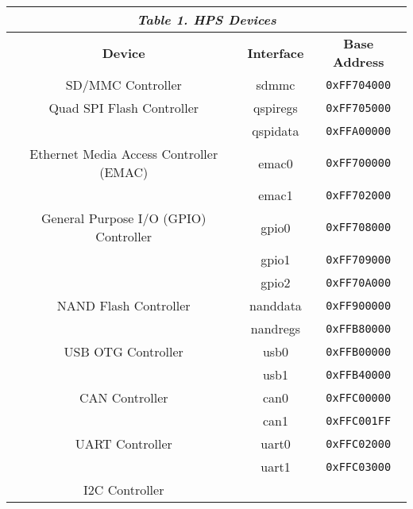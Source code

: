 

\begin{table}[h]
    \centering
    \begin{tabular}{|c|c|c|}
        \hline
        \multicolumn{3}{|c|}{\textit{\textbf{Table 1. HPS Devices}}}
        \\\hline
            \textbf{Device}
            & \textbf{Interface}
            & \textbf{Base Address}
        \\\hline
            SD/MMC Controller
            & sdmmc
            & \texttt{0xFF704000}
        \\\hline
            Quad SPI Flash Controller
            & qspiregs
            & \texttt{0xFF705000}
        \\\cline{2-3}
            & qspidata
            & \texttt{0xFFA00000}
        \\\hline
            Ethernet Media Access Controller (EMAC)
            & emac0
            & \texttt{0xFF700000} 
        \\\cline{2-3}
            & emac1
            & \texttt{0xFF702000}
        \\\hline
            General Purpose I/O (GPIO) Controller
            & gpio0
            & \texttt{0xFF708000}
        \\\cline{2-3}
            & gpio1
            & \texttt{0xFF709000}
        \\\cline{2-3}
            & gpio2
            & \texttt{0xFF70A000}
        \\\hline
            NAND Flash Controller
            & nanddata
            & \texttt{0xFF900000}
        \\\cline{2-3}
            & nandregs
            & \texttt{0xFFB80000}
        \\\hline
            USB OTG Controller
            & usb0
            & \texttt{0xFFB00000} 
        \\\cline{2-3}
            & usb1
            & \texttt{0xFFB40000}
        \\\hline
            CAN Controller
            & can0
            & \texttt{0xFFC00000} 
        \\\cline{2-3}
            & can1
            & \texttt{0xFFC001FF}
        \\\hline
            UART Controller
            & uart0
            & \texttt{0xFFC02000} 
        \\\cline{2-3}
            & uart1
            & \texttt{0xFFC03000}
        \\\hline
            I2C Controller

\end{tabular}
\end{table}

